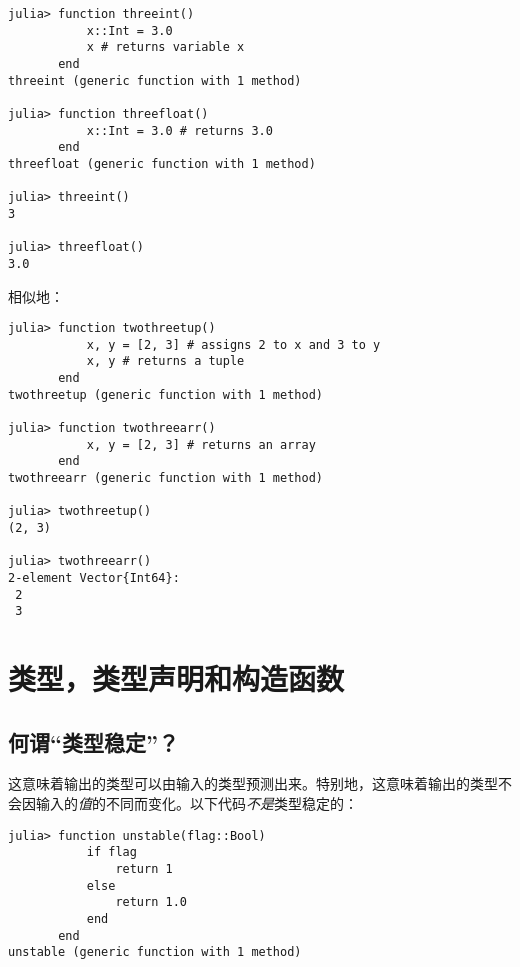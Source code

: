 \begin{verbatim}
julia> function threeint()
           x::Int = 3.0
           x # returns variable x
       end
threeint (generic function with 1 method)

julia> function threefloat()
           x::Int = 3.0 # returns 3.0
       end
threefloat (generic function with 1 method)

julia> threeint()
3

julia> threefloat()
3.0
\end{verbatim}



相似地：




\begin{verbatim}
julia> function twothreetup()
           x, y = [2, 3] # assigns 2 to x and 3 to y
           x, y # returns a tuple
       end
twothreetup (generic function with 1 method)

julia> function twothreearr()
           x, y = [2, 3] # returns an array
       end
twothreearr (generic function with 1 method)

julia> twothreetup()
(2, 3)

julia> twothreearr()
2-element Vector{Int64}:
 2
 3
\end{verbatim}



\hypertarget{5608144491570256308}{}


\section{类型，类型声明和构造函数}



\hypertarget{11170875837665758023}{}


\subsection{何谓“类型稳定”？}



这意味着输出的类型可以由输入的类型预测出来。特别地，这意味着输出的类型不会因输入的\emph{值}的不同而变化。以下代码\emph{不是}类型稳定的：




\begin{verbatim}
julia> function unstable(flag::Bool)
           if flag
               return 1
           else
               return 1.0
           end
       end
unstable (generic function with 1 method)
\end{verbatim}



